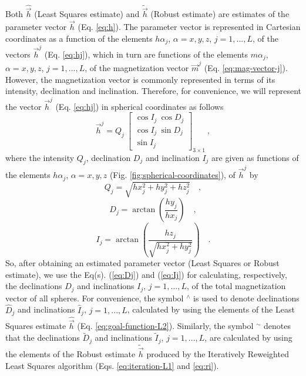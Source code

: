 \documentclass[journal abbreviation, npg]{copernicus}
\begin{document}
Both $\hat{\vec{h}}$ (Least Squares estimate) and $\tilde{\vec{h}}$ (Robust estimate) are estimates of the parameter vector $\vec{h}$ (Eq. \ref{eq:h}). The parameter vector is represented in Cartesian coordinates as a function of the elements $h\alpha_{j}$, $\alpha = x, y, z$, $j = 1, ..., L$, of the vectors $\vec{h}^{j}$ (Eq. \ref{eq:hj}), which in turn are functions of the elements $m\alpha_{j}$, $\alpha = x, y, z$, $j = 1, ..., L$, of the magnetization vector $\vec{m}^{j}$ (Eq. \ref{eq:mag-vector-j}). However, the magnetization vector is commonly represented in terms of its intensity, declination and inclination. Therefore, for convenience, we will represent the vector $\vec{h}^{j}$ (Eq. \ref{eq:hj}) in spherical coordinates as follows
\begin{equation}
\vec{h}^{j} = Q_{j} \:
\left[
\begin{array}{c}
\cos I_{j} \: \cos D_{j} \\
\cos I_{j} \: \sin D_{j} \\
\sin I_{j}
\end{array}
\right]_{3 \times 1} \: ,
\label{eq:hj-spheric}
\end{equation}
where the intensity $Q_{j}$, declination $D_{j}$ and inclination $I_{j}$ are given as functions of the elements $h\alpha_{j}$, $\alpha = x, y, z$ (Fig. \ref{fig:spherical-coordinates}), of $\vec{h}^{j}$ by
\begin{equation}
Q_{j} = \sqrt{hx_{j}^{2} + hy_{j}^{2} + hz_{j}^{2}} \quad ,
\label{eq:Qj}
\end{equation}
\begin{equation}
D_{j} = \arctan \left( \dfrac{hy_{j}}{hx_{j}} \right) \quad ,
\label{eq:Dj}
\end{equation}
\begin{equation}
I_{j} = \arctan \left( \dfrac{hz_{j}}{\sqrt{hx_{j}^{2} + hy_{j}^{2}}} \right) \quad .
\label{eq:Ij}
\end{equation}
So, after obtaining an estimated parameter vector (Least Squares or Robust estimate), we use the Eq(s). (\ref{eq:Dj}) and (\ref{eq:Ij}) for calculating, respectively, the declinations $D_{j}$ and inclinations $I_{j}$, $j = 1, ..., L$, of the total magnetization vector of all spheres. For convenience, the symbol $^\wedge$ is used to denote declinations $\hat{D}_{j}$ and inclinations $\hat{I}_{j}$, $j = 1, ..., L$, calculated by using the elements of the Least Squares estimate $\hat{\vec{h}}$ (Eq. \ref{eq:goal-function-L2}). Similarly, the symbol $^\sim$ denotes that the declinations $\tilde{D}_{j}$ and inclinations $\tilde{I}_{j}$, $j = 1, ..., L$, are calculated by using the elements of the Robust estimate $\tilde{\vec{h}}$ produced by the Iteratively Reweighted Least Squares algorithm (Eqs. \ref{eq:iteration-L1} and \ref{eq:ri}).
\end{document}
